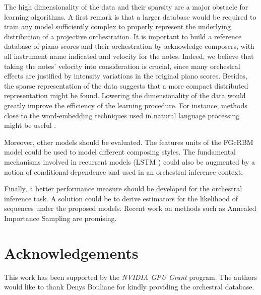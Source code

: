 \documentclass[letterpaper]{article}
\begin{document}
The high dimensionality of the data and their sparsity are a major obstacle for learning algorithms.
A first remark is that a larger database would be required to train any model sufficiently complex to properly represent the underlying distribution of a projective orchestration.
It is important to build a reference database of piano scores and their orchestration by acknowledge composers, with all instrument name indicated and velocity for the notes. 
Indeed, we believe that taking the notes' velocity into consideration is crucial, since many orchestral effects are justified by intensity variations in the original piano scores. 
Besides, the sparse representation of the data suggests that a more compact distributed representation might be found. Lowering the dimensionality of the data would greatly improve the efficiency of the learning procedure. For instance, methods close to the word-embedding techniques used in natural language processing might be useful \cite{kiros2015skip}.

Moreover, other models should be evaluated. The features units of the FGcRBM model could be used to model different composing styles. The fundamental mechanisms involved in recurrent models (LSTM \cite{hochreiter1997long}) could also be augmented by a notion of conditional dependence and used in an orchestral inference context.

Finally, a better performance measure should be developed for the orchestral inference task. A solution could be to derive estimators for the likelihood of sequences under the proposed models. Recent work on methods such as Annealed Importance Sampling are promising.

\section{Acknowledgements}
This work has been supported by the \textit{NVIDIA GPU Grant} program.
The authors would like to thank Denys Bouliane for kindly providing the orchestral database.


\end{document}
